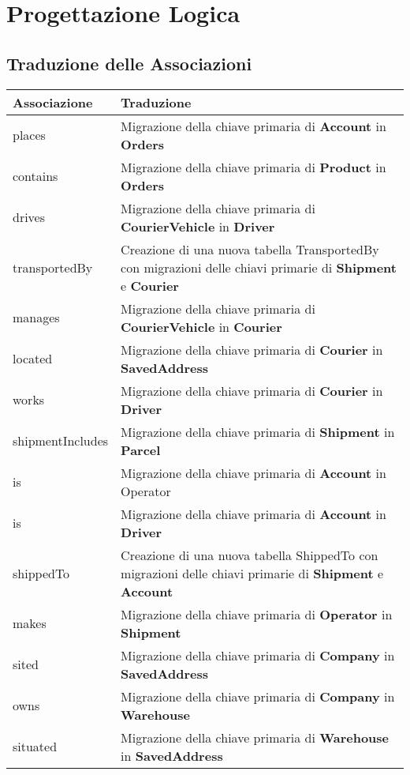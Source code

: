\section{Progettazione Logica}

\subsection{Traduzione delle Associazioni}

\begin{tabularx}{\textwidth}{YY}
    \toprule
    \textbf{Associazione} & \textbf{Traduzione} \\
    \midrule
    places & Migrazione della chiave primaria di \textbf{Account} in \textbf{Orders} \\
    contains & Migrazione della chiave primaria di \textbf{Product} in \textbf{Orders} \\
    drives & Migrazione della chiave primaria di \textbf{CourierVehicle} in \textbf{Driver} \\
    transportedBy & Creazione di una nuova tabella TransportedBy con migrazioni delle chiavi primarie di \textbf{Shipment} e \textbf{Courier} \\
    manages & Migrazione della chiave primaria di \textbf{CourierVehicle} in \textbf{Courier} \\
    located & Migrazione della chiave primaria di \textbf{Courier} in \textbf{SavedAddress} \\
    works & Migrazione della chiave primaria di \textbf{Courier} in \textbf{Driver} \\
    shipmentIncludes & Migrazione della chiave primaria di \textbf{Shipment} in \textbf{Parcel} \\
    is & Migrazione della chiave primaria di \textbf{Account} in Operator \\
    is & Migrazione della chiave primaria di \textbf{Account} in \textbf{Driver} \\
    shippedTo & Creazione di una nuova tabella ShippedTo con migrazioni delle chiavi primarie di \textbf{Shipment} e \textbf{Account} \\
    makes & Migrazione della chiave primaria di \textbf{Operator} in \textbf{Shipment} \\
    sited & Migrazione della chiave primaria di \textbf{Company} in \textbf{SavedAddress} \\
    owns & Migrazione della chiave primaria di \textbf{Company} in \textbf{Warehouse} \\
    situated & Migrazione della chiave primaria di \textbf{Warehouse} in \textbf{SavedAddress} \\

\end{tabularx}

